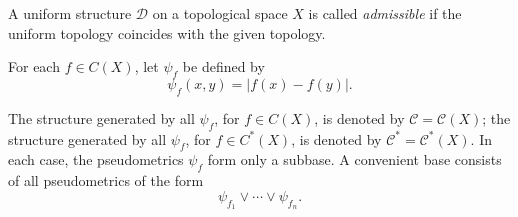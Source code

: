 A uniform structure $\mathcal{D}$ on a topological space $X$ is called \textit{admissible} if the uniform topology coincides with the given topology.

For each $f \in C(X)$, let $\psi_f$ be defined by
$$\psi_f(x, y) = |f(x) - f(y)|.$$

The structure generated by all $\psi_f$, for $f \in C(X)$, is denoted by $\mathcal{C} = \mathcal{C}(X)$; the structure generated by all $\psi_f$, for $f \in C^*(X)$, is denoted by $\mathcal{C}^* = \mathcal{C}^*(X)$. In each case, the pseudometrics $\psi_f$ form only a subbase. A convenient base consists of all pseudometrics of the form
$$\psi_{f_1} \vee \cdots \vee \psi_{f_n}.$$
